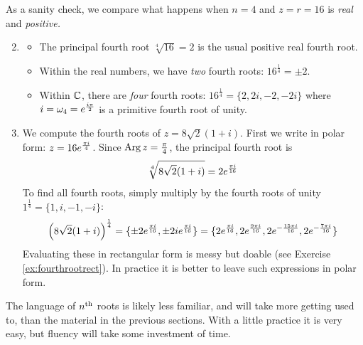 \begin{examples}{}{}
	\exstart As a sanity check, we compare what happens when $n=4$ and $z=r=16$ is \emph{real} and \emph{positive.}
	\begin{enumerate}\setcounter{enumi}{1}
	  \item[]\begin{itemize}
		  \item The principal fourth root $\sqrt[4]{16}=2$ is the usual positive real fourth root.
		  \item Within the real numbers, we have \emph{two} fourth roots: $16^{\frac 14}=\pm 2$.
		  \item Within $\mathbb{C}$, there are \emph{four} fourth roots: $16^{\frac 14}=\{2,2i,-2,-2i\}$ where $i=\omega_4=e^{\frac{i\pi}{2}}$ is a primitive fourth root of unity.
	\end{itemize}
	
	  \item We compute the fourth roots of $z=8\sqrt 2(1+i)$.\smallbreak
		First we write in polar form: $z=16e^{\frac{\pi i}{4}}$. Since $\operatorname{Arg} z=\frac\pi 4$, the principal fourth root is
		\[
			\sqrt[4]{8\sqrt 2(1+i)}=2e^{\frac{\pi i}{16}}
		\]
		To find all fourth roots, simply multiply by the fourth roots of unity $1^{\frac 14}=\{1,i,-1,-i\}$:
		\[
			\left(8\sqrt 2(1+i)\right)^{\frac 14}=\{\pm 2e^{\frac{\pi i}{16}},\pm 2ie^{\frac{\pi i}{16}}\} =\{2e^{\frac{\pi i}{16}},2e^{\frac{9\pi i}{16}},2e^{-\frac{15\pi i}{16}},2e^{-\frac{7\pi i}{16}}\}
		\]
	 	Evaluating these in rectangular form is messy but doable (see Exercise \ref{ex:fourthrootrect}). In practice it is better to leave such expressions in polar form.	
	\end{enumerate}
\end{examples}


\goodbreak

The language of $n\textsuperscript{th}$ roots is likely less familiar, and will take more getting used to, than the material in the previous sections. With a little practice it is very easy, but fluency will take some investment of time.

